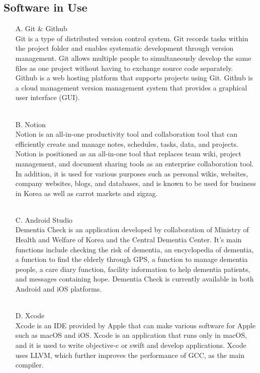 \documentclass[conference]{IEEEtran}
\begin{document}
\subsection{Software in Use}\label{SCM}
\begin{itemize}
\item [A.] Git \& Github\\
Git is a type of distributed version control system. Git records tasks within the project folder and enables systematic development through version management. Git allows multiple people to simultaneously develop the same files as one project without having to exchange source code separately. Github is a web hosting platform that supports projects using Git. Github is a cloud management version management system that provides a graphical user interface (GUI).\\
\\
\item [B.]Notion\\ 
Notion is an all-in-one productivity tool and collaboration tool that can efficiently create and manage notes, schedules, tasks, data, and projects. Notion is positioned as an all-in-one tool that replaces team wiki, project management, and document sharing tools as an enterprise collaboration tool. In addition, it is used for various purposes such as personal wikis, websites, company websites, blogs, and databases, and is known to be used for business in Korea as well as carrot markets and zigzag.\\
\\
\item [C.] Android Studio\\
Dementia Check is an application developed by collaboration of Ministry of Health and Welfare of Korea and the Central Dementia Center. It’s main functions include checking the risk of dementia, an encyclopedia of dementia, a function to find the elderly through GPS, a function to manage dementia people, a care diary function, facility information to help dementia patients, and messages containing hope. Dementia Check is currently available in both Android and iOS platforms.\\
\\
\item [D.] Xcode\\
Xcode is an IDE provided by Apple that can make various software for Apple such as macOS and iOS. Xcode is an application that runs only in macOS, and it is used to write objective-c or swift and develop applications. Xcode uses LLVM, which further improves the performance of GCC, as the main compiler.\\

\end{itemize}
\end{document}
